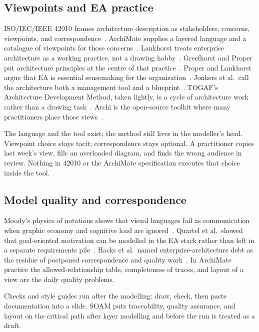 \documentclass[10pt,journal,compsoc]{IEEEtran}
\begin{document}
\subsection{Viewpoints and EA practice}

ISO/IEC/IEEE 42010 frames architecture description as stakeholders, concerns, viewpoints, and correspondence~\cite{iso42010}. ArchiMate supplies a layered language and a catalogue of viewpoints for those concerns~\cite{archimate32}. Lankhorst treats enterprise architecture as a working practice, not a drawing hobby~\cite{lankhorst2017}. Greefhorst and Proper put architecture principles at the centre of that practice~\cite{greefhorst2011}. Proper and Lankhorst argue that EA is essential sensemaking for the organisation~\cite{proper2014}. Jonkers et al.\ call the architecture both a management tool and a blueprint~\cite{jonkers2006}. TOGAF's Architecture Development Method, taken lightly, is a cycle of architecture work rather than a drawing task~\cite{togaf10}. Archi is the open-source toolkit where many practitioners place those views~\cite{archi}.

The language and the tool exist; the method still lives in the modeller's head. Viewpoint choice stays tacit; correspondence stays optional. A practitioner copies last week's view, fills an overloaded diagram, and finds the wrong audience in review. Nothing in 42010 or the ArchiMate specification executes that choice inside the tool.

\subsection{Model quality and correspondence}

Moody's physics of notations shows that visual languages fail as communication when graphic economy and cognitive load are ignored~\cite{moody2009}. Quartel et al.\ showed that goal-oriented motivation can be modelled in the EA stack rather than left in a separate requirements pile~\cite{quartel2009}. Hacks et al.\ named enterprise-architecture debt as the residue of postponed correspondence and quality work~\cite{hacks2019}. In ArchiMate practice the allowed-relationship table, completeness of traces, and layout of a view are the daily quality problems.

Checks and style guides run after the modelling: draw, check, then paste documentation into a slide. SOAM puts traceability, quality assurance, and layout on the critical path after layer modelling and before the run is treated as a draft.
\end{document}
